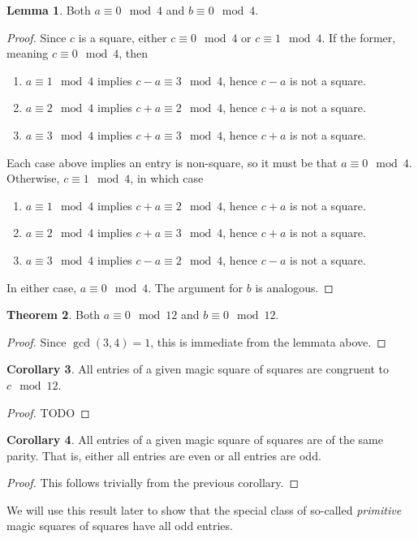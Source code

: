 \documentclass[11pt]{amsart}
\theoremstyle{definition}
\newtheorem{thm}{Theorem}[section]
\newtheorem{lem}[thm]{Lemma}
\newtheorem{cor}[thm]{Corollary}
\begin{document}
\begin{lem}
  Both $a \equiv 0 \mod 4$ and $b \equiv 0 \mod 4$.
  \begin{proof}
    Since $c$ is a square, either $c \equiv 0 \mod 4$ or $c \equiv 1 \mod 4$. If the former, meaning $c \equiv 0 \mod 4$, then
    \begin{enumerate}
      \item $a \equiv 1 \mod 4$ implies $c - a \equiv 3 \mod 4$, hence $c - a$ is not a square.
      \item $a \equiv 2 \mod 4$ implies $c + a \equiv 2 \mod 4$, hence $c + a$ is not a square.
      \item $a \equiv 3 \mod 4$ implies $c + a \equiv 3 \mod 4$, hence $c + a$ is not a square.
    \end{enumerate}
    Each case above implies an entry is non-square, so it must be that $a \equiv 0 \mod 4$. Otherwise, $c \equiv 1 \mod 4$, in which case
    \begin{enumerate}
      \item $a \equiv 1 \mod 4$ implies $c + a \equiv 2 \mod 4$, hence $c + a$ is not a square.
      \item $a \equiv 2 \mod 4$ implies $c + a \equiv 3 \mod 4$, hence $c + a$ is not a square.
      \item $a \equiv 3 \mod 4$ implies $c - a \equiv 2 \mod 4$, hence $c - a$ is not a square.
    \end{enumerate}
    In either case, $a \equiv 0 \mod 4$. The argument for $b$ is analogous.
  \end{proof}
\end{lem}
\begin{thm}
  Both $a \equiv 0 \mod 12$ and $b \equiv 0 \mod 12$.
  \begin{proof}
    Since $\gcd(3, 4) = 1$, this is immediate from the lemmata above.
  \end{proof}
\end{thm}
\begin{cor}
  All entries of a given magic square of squares are congruent to $c \mod 12$.
  \begin{proof}
    TODO
  \end{proof}
\end{cor}
\begin{cor}
  All entries of a given magic square of squares are of the same parity. That is, either all entries are even or all entries are odd.
  \begin{proof}
    This follows trivially from the previous corollary.
  \end{proof}
\end{cor}
We will use this result later to show that the special class of so-called \emph{primitive} magic squares of squares have all odd entries.
\end{document}
